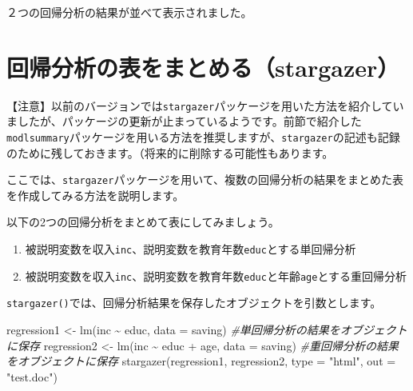 \documentclass[
]{book}
\newenvironment{Shaded}{\begin{snugshade}}{\end{snugshade}}
\newcommand{\AttributeTok}[1]{\textcolor[rgb]{0.77,0.63,0.00}{#1}}
\newcommand{\CommentTok}[1]{\textcolor[rgb]{0.56,0.35,0.01}{\textit{#1}}}
\newcommand{\FunctionTok}[1]{\textcolor[rgb]{0.00,0.00,0.00}{#1}}
\newcommand{\NormalTok}[1]{#1}
\newcommand{\OtherTok}[1]{\textcolor[rgb]{0.56,0.35,0.01}{#1}}
\newcommand{\SpecialCharTok}[1]{\textcolor[rgb]{0.00,0.00,0.00}{#1}}
\newcommand{\StringTok}[1]{\textcolor[rgb]{0.31,0.60,0.02}{#1}}
\providecommand{\tightlist}{%
  \setlength{\itemsep}{0pt}\setlength{\parskip}{0pt}}
\begin{document}
２つの回帰分析の結果が並べて表示されました。

\hypertarget{ux56deux5e30ux5206ux6790ux306eux8868ux3092ux307eux3068ux3081ux308bstargazer}{%
\section{回帰分析の表をまとめる（stargazer）}\label{ux56deux5e30ux5206ux6790ux306eux8868ux3092ux307eux3068ux3081ux308bstargazer}}

【注意】以前のバージョンでは\texttt{stargazer}パッケージを用いた方法を紹介していましたが、パッケージの更新が止まっているようです。前節で紹介した\texttt{modlsummary}パッケージを用いる方法を推奨しますが、\texttt{stargazer}の記述も記録のために残しておきます。（将来的に削除する可能性もあります。

ここでは、\texttt{stargazer}パッケージを用いて、複数の回帰分析の結果をまとめた表を作成してみる方法を説明します。

以下の2つの回帰分析をまとめて表にしてみましょう。

\begin{enumerate}
\def\labelenumi{\arabic{enumi}.}
\tightlist
\item
  被説明変数を収入\texttt{inc}、説明変数を教育年数\texttt{educ}とする単回帰分析
\item
  被説明変数を収入\texttt{inc}、説明変数を教育年数\texttt{educ}と年齢\texttt{age}とする重回帰分析
\end{enumerate}

\texttt{stargazer()}では、回帰分析結果を保存したオブジェクトを引数とします。

\begin{Shaded}
\begin{Highlighting}[]
\NormalTok{regression1 }\OtherTok{\textless{}{-}} \FunctionTok{lm}\NormalTok{(inc }\SpecialCharTok{\textasciitilde{}}\NormalTok{ educ, }\AttributeTok{data =}\NormalTok{ saving) }\CommentTok{\#単回帰分析の結果をオブジェクトに保存}
\NormalTok{regression2 }\OtherTok{\textless{}{-}} \FunctionTok{lm}\NormalTok{(inc }\SpecialCharTok{\textasciitilde{}}\NormalTok{ educ }\SpecialCharTok{+}\NormalTok{ age, }\AttributeTok{data =}\NormalTok{ saving) }\CommentTok{\#重回帰分析の結果をオブジェクトに保存}
\FunctionTok{stargazer}\NormalTok{(regression1, regression2, }\AttributeTok{type =} \StringTok{"html"}\NormalTok{, }\AttributeTok{out =} \StringTok{"test.doc"}\NormalTok{)}
\end{Highlighting}
\end{Shaded}
\end{document}
